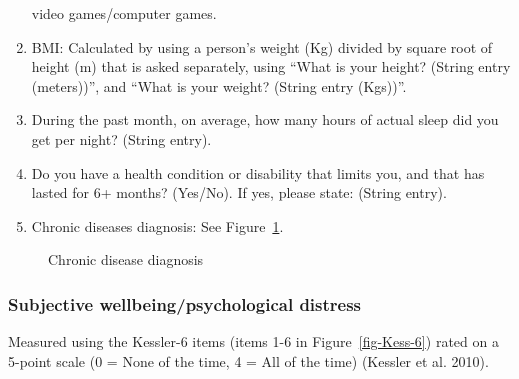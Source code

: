 \documentclass[
]{interact}
\begin{document}
\begin{enumerate}
  video games/computer games.
\item
  BMI: Calculated by using a person's weight (Kg) divided by square root
  of height (m) that is asked separately, using ``What is your height?
  (String entry (meters))'', and ``What is your weight? (String entry
  (Kgs))''.
\item
  During the past month, on average, how many hours of actual sleep did
  you get per night? (String entry).
\item
  Do you have a health condition or disability that limits you, and that
  has lasted for 6+ months? (Yes/No). If yes, please state: (String
  entry).
\item
  Chronic diseases diagnosis: See Figure~\ref{fig-chrondis}.
\end{enumerate}

\begin{figure}


\caption{\label{fig-chrondis}Chronic disease diagnosis}

\end{figure}%

\subsubsection{Subjective wellbeing/psychological
distress}\label{subjective-wellbeingpsychological-distress}

Measured using the Kessler-6 items (items 1-6 in
Figure~\ref{fig-Kess-6}) rated on a 5-point scale (0 = None of the time,
4 = All of the time) (Kessler et al. 2010).
\end{document}
